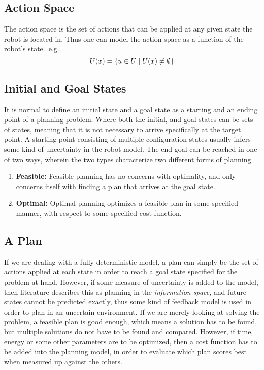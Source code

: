 \subsection{Action Space}
The action space is the set of actions that can be applied at any given state
the robot is located in. Thus one can model the action space as a function of
the robot's state.\ e.g.
\[
  U(x) = \lbrace u \in U \mid U(x)
    \neq \emptyset \rbrace
\]

\subsection{Initial and Goal States}
It is normal to define an initial state and a goal state as a starting and an
ending point of a planning problem. Where both the initial, and goal states can
be sets of states, meaning that it is not necessary to arrive specifically at
the target point. A starting point consisting of multiple configuration states
usually infers some kind of uncertainty in the robot model. The end goal can be
reached in one of two ways, wherein the two types characterize two different
forms of planning.
\begin{enumerate}
\item\textbf{Feasible:} Feasible planning has no concerns with optimality, and
  only concerns itself with finding a plan that arrives at the goal state.
\item\textbf{Optimal:} Optimal planning optimizes a feasible plan in some
  specified manner, with respect to some specified cost function.
\end{enumerate}

\subsection{A Plan}
If we are dealing with a fully deterministic model, a plan can simply be the set
of actions applied at each state in order to reach a goal state specified for
the problem at hand. However, if some measure of uncertainty is added to the
model, then literature describes this as planning in the \textit{information
  space}, and future states cannot be predicted exactly, thus some kind of
feedback model is used in order to plan in an uncertain environment. If we are
merely looking at solving the problem, a feasible plan is good enough, which
means a solution has to be found, but multiple solutions do not have to be found
and compared. However, if time, energy or some other parameters are to be
optimized, then a cost function has to be added into the planning model, in
order to evaluate which plan scores best when measured up against the others.

